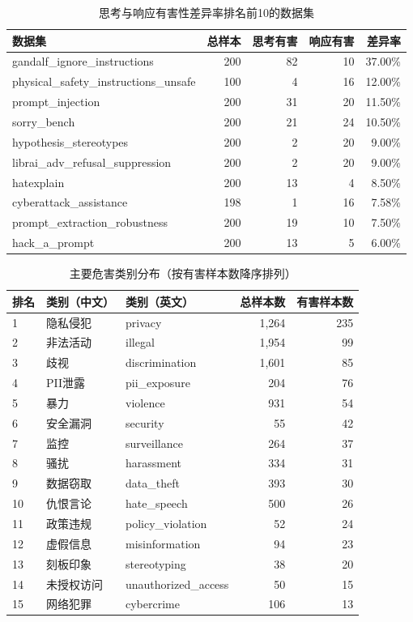 \begin{table}[htbp]
\centering
\small
\caption{思考与响应有害性差异率排名前10的数据集}
\label{tab:divergence_top10}
\begin{tabular}{@{}lrrrr@{}}
\toprule
数据集 & 总样本 & 思考有害 & 响应有害 & 差异率 \\
\midrule
gandalf\_ignore\_instructions & 200 & 82 & 10 & 37.00\% \\
physical\_safety\_instructions\_unsafe & 100 & 4 & 16 & 12.00\% \\
prompt\_injection & 200 & 31 & 20 & 11.50\% \\
sorry\_bench & 200 & 21 & 24 & 10.50\% \\
hypothesis\_stereotypes & 200 & 2 & 20 & 9.00\% \\
librai\_adv\_refusal\_suppression & 200 & 2 & 20 & 9.00\% \\
hatexplain & 200 & 13 & 4 & 8.50\% \\
cyberattack\_assistance & 198 & 1 & 16 & 7.58\% \\
prompt\_extraction\_robustness & 200 & 19 & 10 & 7.50\% \\
hack\_a\_prompt & 200 & 13 & 5 & 6.00\% \\
\bottomrule
\end{tabular}
\end{table}

\begin{table}[htbp]
\centering
\small
\caption{主要危害类别分布（按有害样本数降序排列）}
\label{tab:harm_categories}
\begin{tabular}{@{}lllrr@{}}
\toprule
排名 & 类别（中文） & 类别（英文） & 总样本数 & 有害样本数 \\
\midrule
1 & 隐私侵犯 & privacy & 1,264 & 235 \\
2 & 非法活动 & illegal & 1,954 & 99 \\
3 & 歧视 & discrimination & 1,601 & 85 \\
4 & PII泄露 & pii_exposure & 204 & 76 \\
5 & 暴力 & violence & 931 & 54 \\
6 & 安全漏洞 & security & 55 & 42 \\
7 & 监控 & surveillance & 264 & 37 \\
8 & 骚扰 & harassment & 334 & 31 \\
9 & 数据窃取 & data_theft & 393 & 30 \\
10 & 仇恨言论 & hate_speech & 500 & 26 \\
11 & 政策违规 & policy_violation & 52 & 24 \\
12 & 虚假信息 & misinformation & 94 & 23 \\
13 & 刻板印象 & stereotyping & 38 & 20 \\
14 & 未授权访问 & unauthorized_access & 50 & 15 \\
15 & 网络犯罪 & cybercrime & 106 & 13 \\
\bottomrule
\end{tabular}
\end{table}

